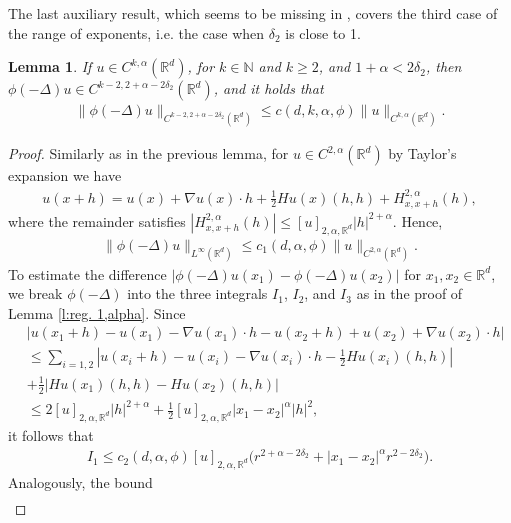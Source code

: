 \documentclass[12pt,a4paper,onecolumn]{amsart}
\newtheorem{lem}[thm]{Lemma}
\theoremstyle{definition}
\newcommand{\R}{\mathbb{R}}
\newcommand{\N}{\mathbb{N}}
\newcommand{\1}{\mathbf 1}
\newcommand{\LoR}{\phi(-\Delta)}
\numberwithin{equation}{section}
\begin{document}
The last auxiliary result, which seems to be missing in \cite{Silvestre2007regularity}, covers the third case of the range of exponents, i.e. the case when $\delta_2$ is close to 1.
\begin{lem}\label{l:reg. 2,alpha}If $u\in C^{k,\alpha}(\R^d)$, for $k\in \N$ and $k\ge2$, and $1+\alpha<2\delta_2$, then $\LoR u\in C^{k-2,2+\alpha-2\delta_2}(\R^d)$, and it holds that
    \begin{align}\label{eq:reg. 2,alpha}
        \|\LoR u\|_{C^{k-2,2+\alpha-2\delta_2}(\R^d)}\le c(d,k,\alpha,\phi)\|u\|_{C^{k,\alpha}(\R^d)}. 
    \end{align}
\end{lem}

\begin{proof}
Similarly as in the previous lemma, for $u\in C^{2,\alpha}(\R^d)$ by Taylor's expansion we have
    \begin{align*}
        u(x+h)=u(x)+\nabla u(x)\cdot h+\frac12 Hu(x)(h,h)+H^{2,\alpha}_{x,x+h}(h), 
    \end{align*}
    where the remainder satisfies $|H^{2,\alpha}_{x,x+h}(h)|\le [u]_{2,\alpha,\R^d}|h|^{2+\alpha}$. Hence, 
    \begin{align}\label{eq:LoR bounded no3}
        \| \LoR u\|_{L^\infty(\R^d)}\le c_1(d,\alpha,\phi) \| u\|_{C^{2,\alpha}(\R^d)}.
     \end{align}
     To estimate the difference $|\LoR u(x_1)-\LoR u(x_2)|$ for $x_1,x_2\in\R^d$, we break $\LoR$ into the three integrals $I_1$, $I_2$, and $I_3$ as in the proof of Lemma \ref{l:reg. 1,alpha}.
Since
     \begin{align*}
         &|u(x_1+h)-u(x_1)-\nabla u(x_1)\cdot h-u(x_2+h)+u(x_2)+\nabla u(x_2)\cdot h|\\
         &\le\sum_{i=1,2}\left|u(x_i+h)-u(x_i)-\nabla u(x_i)\cdot h-\frac12 Hu(x_i)(h,h)\right|\\
         &+\frac 1 2\left|Hu(x_1)(h,h)-Hu(x_2)(h,h)\right|\\
         &\le 2[u]_{2,\alpha,\R^d}|h|^{2+\alpha}+\frac12 [u]_{2,\alpha,\R^d}|x_1-x_2|^\alpha |h|^2,
     \end{align*}
     it follows that
     \begin{align}\label{eq:reg. 2,alpha no1}
         I_1\le c_2(d,\alpha,\phi)[u]_{2,\alpha,\R^d}\big(r^{2+\alpha-2\delta_2}+|x_1-x_2|^\alpha r^{2-2\delta_2}\big).
     \end{align}
Analogously, the bound
 \begin{align}\label{eq:reg. 2,alpha no2}

\end{align}
\end{proof}
\end{document}
